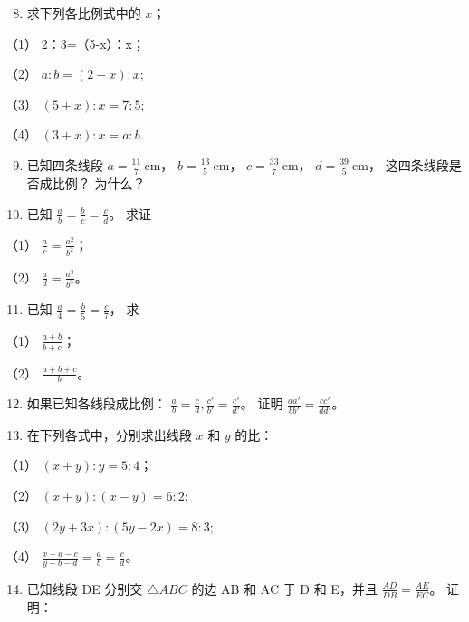 \begin{enumerate}
\setcounter{enumi}{7}
\item
  求下列各比例式中的 \(x\)；
\end{enumerate}

（1） 2：3=（5-x）：x；

（2） \(a:b = (2 - x):x;\)

（3） \((5 + x):x = 7:5;\)

（4） \((3 + x): x = a:b.\)

\begin{enumerate}
\setcounter{enumi}{8}
\item
  已知四条线段 \(a = \frac{11}{7} \mathrm{~cm}\)，
  \(b = \frac{13}{5} \mathrm{~cm}\)，
  \(c = \frac{33}{7} \mathrm{~cm}\)，
  \(d = \frac{39}{5} \mathrm{~cm}\)， 这四条线段是否成比例？ 为什么？
\item
  已知 \(\frac{a}{b} = \frac{b}{c} = \frac{c}{d}\)。 求证
\end{enumerate}

（1） \(\frac{a}{c} = \frac{a^2}{b^2}\)；

（2） \(\frac{a}{d} = \frac{a^3}{b^3}\)。

\begin{enumerate}
\setcounter{enumi}{10}
\item
  已知 \(\frac{a}{4} = \frac{b}{5} = \frac{c}{7}\)， 求
\end{enumerate}

（1） \(\frac{a + b}{b + c}\)；

（2） \(\frac{a + b + c}{b}\)。

\begin{enumerate}
\setcounter{enumi}{11}
\item
  如果已知各线段成比例：
  \(\frac{a}{b} = \frac{c}{d}, \frac{c'}{b'} = \frac{c'}{d'}\)。 证明
  \(\frac{aa'}{bb'} = \frac{cc'}{dd'}\)。
\item
  在下列各式中，分别求出线段 \(x\) 和 \(y\) 的比：
\end{enumerate}

（1） \((x + y): y = 5:4\)；

（2） \((x + y): (x - y) = 6:2;\)

（3） \((2y + 3x):(5y - 2x) = 8:3;\)

（4） \(\frac{x - a - c}{y - b - d} = \frac{a}{b} = \frac{c}{d}\)。

\begin{enumerate}
\setcounter{enumi}{13}
\item
  已知线段 DE 分别交 \(\triangle ABC\) 的边 AB 和 AC 于 D 和 E，并且
  \(\frac{AD}{DB} = \frac{AE}{EC}\)。 证明：
\end{enumerate}

